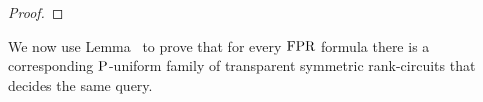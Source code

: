 \documentclass[../paper.tex]{subfiles}
\begin{document}
\begin{proof}






\end{proof}

We now use Lemma~\cite{lem:translating-FOrk} to prove that for every $\text{\upshape FPR}$
formula there is a corresponding $\mathrm{P}$-uniform family of transparent symmetric
rank-circuits that decides the same query.
\end{document}

